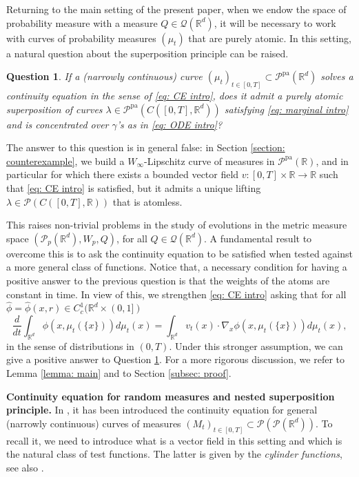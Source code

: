 \documentclass[10pt,leqno]{amsart}
\numberwithin{equation}{section}
\newtheorem{quest}[teorema]{Question}
\newcommand{\R}{\mathbb{R}}
\newcommand{\PP}{\mathcal{P}}
\newcommand{\PPpa}{\PP^{\operatorname{pa}}}
\begin{document}
Returning to the main setting of the present paper, when we endow the space of probability measure with a measure $Q \in \mathcal{Q}(\R^d)$, it will be necessary to work with curves of probability measures $(\mu_t)$ that are purely atomic. In this setting, a natural question about the superposition principle can be raised.

\begin{quest}\label{question}
If a (narrowly continuous) curve $(\mu_t)_{t\in[0,T]} \subset \PPpa(\R^d)$ solves a continuity equation in the sense of \eqref{eq: CE intro}, does it admit a purely atomic superposition of curves $\lambda \in \PPpa(C([0,T],\R^d))$ satisfying \eqref{eq: marginal intro} and is concentrated over $\gamma$'s as in \eqref{eq: ODE intro}?
\end{quest}

The answer to this question is in general false: in Section \ref{section: counterexample}, we build a $W_\infty$-Lipschitz curve of measures in $\PPpa(\R)$, and in particular for which there exists a bounded vector field $v:[0,T]\times \R \to \R$ such that \eqref{eq: CE intro} is satisfied, but it admits a unique lifting $\lambda \in \PP(C([0,T],\R))$ that is atomless. 

This raises non-trivial problems in the study of evolutions in the metric measure space $(\PP_p(\R^d),W_p,Q)$, for all $Q \in \mathcal{Q}(\R^d)$. A fundamental result to overcome this is to ask the continuity equation to be satisfied when tested against a more general class of functions. Notice that, a necessary condition for having a positive answer to the previous question is that the weights of the atoms are constant in time. In view of this, we strengthen \eqref{eq: CE intro} asking that for all $\hat{\phi} = \hat{\phi}(x,r) \in C_c^1(\R^d\times (0,1])$
\begin{equation}\label{eq: CE intro weights}
    \frac{d}{dt}\int_{\R^d} \phi(x,\mu_t(\{x\})) d\mu_t(x) = \int_{\R^d}v_t(x) \cdot \nabla_x \phi(x,\mu_t(\{x\})) d\mu_t(x),
\end{equation}
in the sense of distributions in $(0,T)$. Under this stronger assumption, we can give a positive answer to Question \ref{question}. For a more rigorous discussion, we refer to Lemma \ref{lemma: main} and to Section \ref{subsec: proof}.

\bigskip

\noindent \textbf{Continuity equation for random measures and nested superposition principle.} In \cite{pinzisavare2025}, it has been introduced the continuity equation for general (narrowly continuous) curves of measures $(M_t)_{t\in[0,T]} \subset \PP(\PP(\R^d))$. To recall it, we need to introduce what is a vector field in this setting and which is the natural class of test functions. The latter is given by the \textit{cylinder functions}, see also \cite{fornasier2023density, sodini2023general}.
\end{document}
